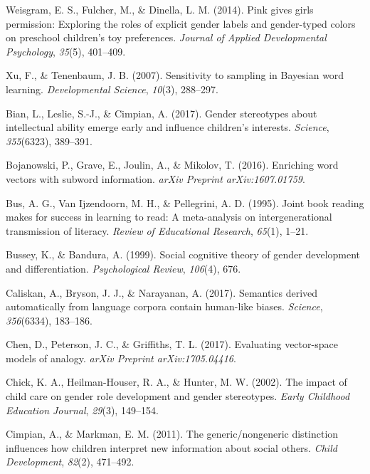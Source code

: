\documentclass[
  english,
  ,man,floatsintext]{apa6}
\begin{document}
\leavevmode\hypertarget{ref-weisgram2014pink}{}%
Weisgram, E. S., Fulcher, M., \& Dinella, L. M. (2014). Pink gives girls permission: Exploring the roles of explicit gender labels and gender-typed colors on preschool children's toy preferences. \emph{Journal of Applied Developmental Psychology}, \emph{35}(5), 401--409.

\leavevmode\hypertarget{ref-xu2007b}{}%
Xu, F., \& Tenenbaum, J. B. (2007). Sensitivity to sampling in Bayesian word learning. \emph{Developmental Science}, \emph{10}(3), 288--297.

\leavevmode\hypertarget{ref-bian2017gender}{}%
Bian, L., Leslie, S.-J., \& Cimpian, A. (2017). Gender stereotypes about intellectual ability emerge early and influence children's interests. \emph{Science}, \emph{355}(6323), 389--391.

\leavevmode\hypertarget{ref-bojanowski2016enriching}{}%
Bojanowski, P., Grave, E., Joulin, A., \& Mikolov, T. (2016). Enriching word vectors with subword information. \emph{arXiv Preprint arXiv:1607.01759}.

\leavevmode\hypertarget{ref-bus1995joint}{}%
Bus, A. G., Van Ijzendoorn, M. H., \& Pellegrini, A. D. (1995). Joint book reading makes for success in learning to read: A meta-analysis on intergenerational transmission of literacy. \emph{Review of Educational Research}, \emph{65}(1), 1--21.

\leavevmode\hypertarget{ref-bussey1999social}{}%
Bussey, K., \& Bandura, A. (1999). Social cognitive theory of gender development and differentiation. \emph{Psychological Review}, \emph{106}(4), 676.

\leavevmode\hypertarget{ref-caliskan2017semantics}{}%
Caliskan, A., Bryson, J. J., \& Narayanan, A. (2017). Semantics derived automatically from language corpora contain human-like biases. \emph{Science}, \emph{356}(6334), 183--186.

\leavevmode\hypertarget{ref-chen2017evaluating}{}%
Chen, D., Peterson, J. C., \& Griffiths, T. L. (2017). Evaluating vector-space models of analogy. \emph{arXiv Preprint arXiv:1705.04416}.

\leavevmode\hypertarget{ref-chick2002impact}{}%
Chick, K. A., Heilman-Houser, R. A., \& Hunter, M. W. (2002). The impact of child care on gender role development and gender stereotypes. \emph{Early Childhood Education Journal}, \emph{29}(3), 149--154.

\leavevmode\hypertarget{ref-cimpian2011generic}{}%
Cimpian, A., \& Markman, E. M. (2011). The generic/nongeneric distinction influences how children interpret new information about social others. \emph{Child Development}, \emph{82}(2), 471--492.
\end{document}
